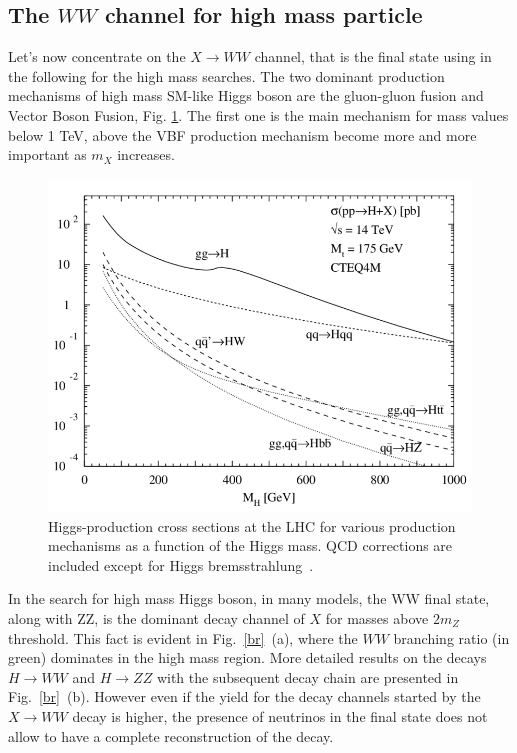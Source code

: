 \subsection*{The $WW$ channel for high mass particle}
Let’s now concentrate on the $X \to WW$ channel, that is the  final state using in the following  for the high mass searches.
The two dominant production mechanisms of high mass SM-like Higgs boson are the
gluon-gluon fusion and Vector Boson Fusion,  Fig. \ref{prod}. 
The first one is the main mechanism for mass values below 1 TeV, above the VBF production mechanism become more and more important as $m_X$ increases.
\begin{figure}
\centering
\includegraphics[scale= 0.4]{../Cap1/Higgs-production-cross-sections-at-the-LHC-for-various-production-mechanisms-as-a}
\caption{Higgs-production cross sections at the LHC for various production mechanisms as a function of the Higgs mass. QCD corrections are included except for Higgs bremsstrahlung~\cite{Djouadi2004}.}
\label{prod}
\end{figure}
In the search for high mass Higgs boson, in many models, the WW final state, along with ZZ, is the dominant decay channel of $X$ for masses above $2m_Z$ threshold. This fact is evident in Fig.~\ref{br}~(a), where the $WW$ branching ratio (in green) dominates in the high mass region. More detailed results on the decays $H \to WW$ and $H \to ZZ $ with the subsequent decay chain are presented in Fig.~\ref{br}~(b).
However even if the yield for the decay channels started by the $X \to WW$ decay is higher,  the
presence of neutrinos in the final state does not allow to have a complete reconstruction of the decay.
